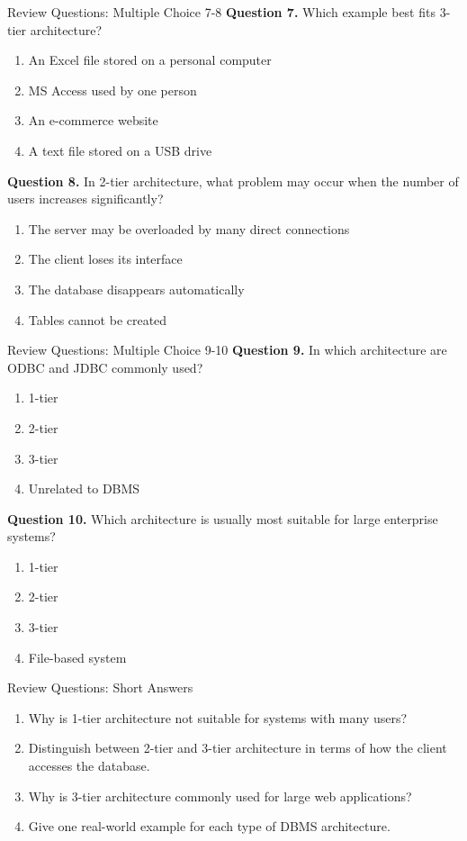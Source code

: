 \documentclass[aspectratio=169,11pt]{beamer}
\newcommand{\tightlist}{\setlength{\itemsep}{2pt}\setlength{\parskip}{0pt}}
\newcommand{\qoption}[2]{\item[#1.] #2}
\begin{document}
\begin{frame}{Review Questions: Multiple Choice 7-8}
\small
\textbf{Question 7.} Which example best fits 3-tier architecture?
\begin{enumerate}\tightlist
  \qoption{A}{An Excel file stored on a personal computer}
  \qoption{B}{MS Access used by one person}
  \qoption{C}{An e-commerce website}
  \qoption{D}{A text file stored on a USB drive}
\end{enumerate}

\textbf{Question 8.} In 2-tier architecture, what problem may occur when the number of users increases significantly?
\begin{enumerate}\tightlist
  \qoption{A}{The server may be overloaded by many direct connections}
  \qoption{B}{The client loses its interface}
  \qoption{C}{The database disappears automatically}
  \qoption{D}{Tables cannot be created}
\end{enumerate}
\end{frame}

\begin{frame}{Review Questions: Multiple Choice 9-10}
\small
\textbf{Question 9.} In which architecture are ODBC and JDBC commonly used?
\begin{enumerate}\tightlist
  \qoption{A}{1-tier}
  \qoption{B}{2-tier}
  \qoption{C}{3-tier}
  \qoption{D}{Unrelated to DBMS}
\end{enumerate}

\textbf{Question 10.} Which architecture is usually most suitable for large enterprise systems?
\begin{enumerate}\tightlist
  \qoption{A}{1-tier}
  \qoption{B}{2-tier}
  \qoption{C}{3-tier}
  \qoption{D}{File-based system}
\end{enumerate}
\end{frame}

\begin{frame}{Review Questions: Short Answers}
\small
\begin{enumerate}\tightlist
  \item Why is 1-tier architecture not suitable for systems with many users?
  \item Distinguish between 2-tier and 3-tier architecture in terms of how the client accesses the database.
  \item Why is 3-tier architecture commonly used for large web applications?
  \item Give one real-world example for each type of DBMS architecture.
\end{enumerate}
\end{frame}
\end{document}
